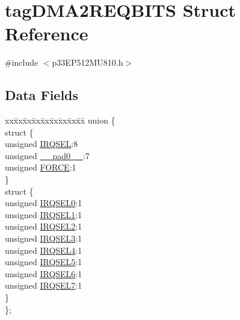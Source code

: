 \hypertarget{structtag_d_m_a2_r_e_q_b_i_t_s}{}\section{tag\+D\+M\+A2\+R\+E\+Q\+B\+I\+TS Struct Reference}
\label{structtag_d_m_a2_r_e_q_b_i_t_s}


{\ttfamily \#include $<$p33\+E\+P512\+M\+U810.\+h$>$}

\subsection*{Data Fields}
\begin{DoxyCompactItemize}
\item 
\begin{tabbing}
xx\=xx\=xx\=xx\=xx\=xx\=xx\=xx\=xx\=\kill
union \{\\
\>struct \{\\
\>\>unsigned \hyperlink{structtag_d_m_a2_r_e_q_b_i_t_s_a5e70ba01366ab2f37371d52661dd93b2}{IRQSEL}:8\\
\>\>unsigned \hyperlink{structtag_d_m_a2_r_e_q_b_i_t_s_adf71f3d8410c1f1dbbc96680a92c49af}{\_\_pad0\_\_}:7\\
\>\>unsigned \hyperlink{structtag_d_m_a2_r_e_q_b_i_t_s_a9b378a7ffc1ab4bc4a3710fb36389180}{FORCE}:1\\
\>\} \\
\>struct \{\\
\>\>unsigned \hyperlink{structtag_d_m_a2_r_e_q_b_i_t_s_ac73241b8f783760c9192dfd8a0773cad}{IRQSEL0}:1\\
\>\>unsigned \hyperlink{structtag_d_m_a2_r_e_q_b_i_t_s_a45e1f083e5a8a59f25acc35910732426}{IRQSEL1}:1\\
\>\>unsigned \hyperlink{structtag_d_m_a2_r_e_q_b_i_t_s_a60dda7474727b3624ca25fa0067a8924}{IRQSEL2}:1\\
\>\>unsigned \hyperlink{structtag_d_m_a2_r_e_q_b_i_t_s_aeaafe1b8c89398ed382054ab628aed78}{IRQSEL3}:1\\
\>\>unsigned \hyperlink{structtag_d_m_a2_r_e_q_b_i_t_s_a91c4162e0f3d4ac7adcdb49302f19840}{IRQSEL4}:1\\
\>\>unsigned \hyperlink{structtag_d_m_a2_r_e_q_b_i_t_s_a6382d50430464cf20b3dee3dbf2e8c01}{IRQSEL5}:1\\
\>\>unsigned \hyperlink{structtag_d_m_a2_r_e_q_b_i_t_s_ace52408ef8c29561f3c56a3fbcbc8217}{IRQSEL6}:1\\
\>\>unsigned \hyperlink{structtag_d_m_a2_r_e_q_b_i_t_s_acce7dedecdf1f53cdbead3edf7c5d53a}{IRQSEL7}:1\\
\>\} \\
\}; \\

\end{tabbing}\end{DoxyCompactItemize}


